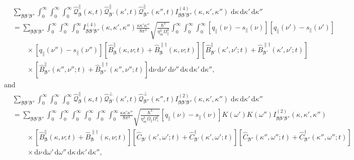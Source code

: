 \documentclass{article}
\begin{document}
\begin{equation}
\begin{split}
&\sum_{\bm{\beta}\bm{\beta}'\bm{\beta}''}\int_0^\infty\int_0^\infty\int_0^\infty\hat{\mathcal{Q}}_{\bm{\beta}}^\parallel(\kappa,t)\hat{\mathcal{Q}}_{\bm{\beta}'}^\parallel(\kappa',t)\hat{\mathcal{Q}}_{\bm{\beta}''}^\parallel(\kappa'',t)I^{(4)}_{\bm{\beta}\bm{\beta}'\bm{\beta}''}(\kappa,\kappa',\kappa'')\;\mathrm{d}\kappa\,\mathrm{d}\kappa'\,\mathrm{d}\kappa''\\
&= \sum_{\bm{\beta}\bm{\beta}'\bm{\beta}''}\int_0^\infty\int_0^\infty\int_0^\infty I^{(4)}_{\bm{\beta}\bm{\beta}'\bm{\beta}''}(\kappa,\kappa',\kappa'')\frac{\kappa\kappa'\kappa''}{8\pi^3}\sqrt{\frac{\hbar^3}{\eta_m^3\Omega_\parallel^3}}\int_0^\infty\int_0^\infty\int_0^\infty\left[q_\parallel(\nu) - s_\parallel(\nu)\right]\left[q_\parallel(\nu') - s_\parallel(\nu')\right]\\
&\qquad\times\left[q_\parallel(\nu'') - s_\parallel(\nu'')\right]\left[\hat{B}_{\bm{\beta}}^\parallel(\kappa,\nu;t) + \hat{B}_{\bm{\beta}}^{\parallel\dagger}(\kappa,\nu;t)\right]\left[\hat{B}_{\bm{\beta}'}^\parallel(\kappa',\nu';t) + \hat{B}_{\bm{\beta}'}^{\parallel\dagger}(\kappa',\nu';t)\right]\\
&\qquad\times\left[\hat{B}_{\bm{\beta}''}^\parallel(\kappa'',\nu'';t) + \hat{B}_{\bm{\beta}''}^{\parallel\dagger}(\kappa'',\nu'';t)\right]\mathrm{d}\nu\,\mathrm{d}\nu'\,\mathrm{d}\nu''\,\mathrm{d}\kappa\,\mathrm{d}\kappa'\,\mathrm{d}\kappa'',
\end{split}
\end{equation}
and
\begin{equation}
\begin{split}
&\sum_{\bm{\beta}\bm{\beta}'\bm{\beta}''}\int_0^\infty\int_0^\infty\int_0^\infty\hat{\mathcal{Q}}_{\bm{\beta}}^\parallel(\kappa,t)\hat{\mathcal{Q}}_{\bm{\beta}'}^\perp(\kappa',t)\hat{\mathcal{Q}}_{\bm{\beta}''}^\perp(\kappa'',t)I^{(2)}_{\bm{\beta}\bm{\beta}'\bm{\beta}''}(\kappa,\kappa',\kappa'')\;\mathrm{d}\kappa\,\mathrm{d}\kappa'\,\mathrm{d}\kappa''\\
&= \sum_{\bm{\beta}\bm{\beta}'\bm{\beta}''}\int_0^\infty\int_0^\infty\int_0^\infty\int_0^\infty\int_0^\infty\int_0^\infty\frac{\kappa\kappa'\kappa''}{8\pi^3}\sqrt{\frac{\hbar^3}{\eta_m^3\Omega_\parallel\Omega_\perp^2}}\left[q_\parallel(\nu) - s_\parallel(\nu)\right]K(\omega')K(\omega'')I^{(2)}_{\bm{\beta}\bm{\beta}'\bm{\beta}''}(\kappa,\kappa',\kappa'')\\
&\qquad\times\left[\hat{B}_{\bm{\beta}}^\parallel(\kappa,\nu;t) + \hat{B}_{\bm{\beta}}^{\parallel\dagger}(\kappa,\nu;t)\right]\left[\hat{C}_{\bm{\beta}'}(\kappa',\omega';t) + \hat{C}_{\bm{\beta}'}^\dagger(\kappa',\omega';t)\right]\left[\hat{C}_{\bm{\beta}''}(\kappa'',\omega'';t) + \hat{C}_{\bm{\beta}''}^\dagger(\kappa'',\omega'';t)\right]\\
&\qquad\times\mathrm{d}\nu\,\mathrm{d}\omega'\,\mathrm{d}\omega''\,\mathrm{d}\kappa\,\mathrm{d}\kappa'\,\mathrm{d}\kappa'',
\end{split}
\end{equation}
\end{document}
